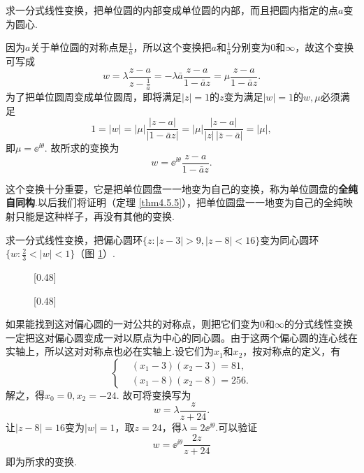 \begin{example}\label{exam2.5.16}
求一分式线性变换，把单位圆的内部变成单位圆的内部，而且把圆内指定的点$a$变为圆心.
\end{example}
\begin{solution}
  因为$a$关于单位圆的对称点是$\frac1{\bar a}$，所以这个变换把$a$和$\frac1{\bar a}$分别变为$0$和$\infty$，故这个变换可写成
  \[w=\lambda\frac{z-a}{z-\frac1{\bar a}}=-\lambda\bar a\frac{z-a}{1-\bar az}=\mu\frac{z-a}{1-\bar az}.\]
为了把单位圆周变成单位圆周，即将满足$|z|=1$的$z$变为满足$|w|=1$的$w,\mu$必须满足
\[1=|w|=|\mu|\frac{|z-a|}{|1-\bar az|}=|\mu|\frac{|z-a|}{|z|\,|\bar z-\bar a|}=|\mu|,\]
即$\mu=\ee^{\ii\theta}$. 故所求的变换为
\[w=\ee^{\ii\theta}\frac{z-a}{1-\bar az}.\]
\end{solution}

这个变换十分重要，它是把单位圆盘一一地变为自己的变换，称为单位圆盘的\textbf{全纯自同构}.以后我们将证明（定理 \ref{thm4.5.5}），把单位圆盘一一地变为自己的全纯映射只能是这种样子，再没有其他的变换.
\begin{example}\label{exam2.5.17}
求一分式线性变换，把偏心圆环$\{z:|z-3|>9,|z-8|<16\}$变为同心圆环$\bigg\{w:\frac23<|w|<1\bigg\}$（图 \ref{fig2.14}）.
\begin{figure}[!ht]
\centering
\subcaptionbox{\label{fig2.14a}}[0.48\textwidth]
{
}
\subcaptionbox{\label{fig2.14b}}[0.48\textwidth]
{
}
\caption{\label{fig2.14}}
\end{figure}
\end{example}
\begin{solution}
如果能找到这对偏心圆的一对公共的对称点，则把它们变为$0$和$\infty$的分式线性变换一定把这对偏心圆变成一对以原点为中心的同心圆。由于这两个偏心圆的连心线在实轴上，所以这对对称点也必在实轴上.设它们为$x_1$和$x_2$，按对称点的定义，有
\[\left\{\begin{aligned}
&(x_1-3)(x_2-3)=81,\\
&(x_1-8)(x_2-8)=256.
\end{aligned}\right.\]
解之，得$x_0=0,x_2=-24$. 故可将变换写为
\[w=\lambda\frac z{z+24}.\]
让$|z-8|=16$变为$|w|=1$，取$z=24$，得$\lambda=2\ee^{\ii\theta}$.可以验证
\[w=\ee^{\ii\theta}\frac{2z}{z+24}\]
即为所求的变换.
\end{solution}

